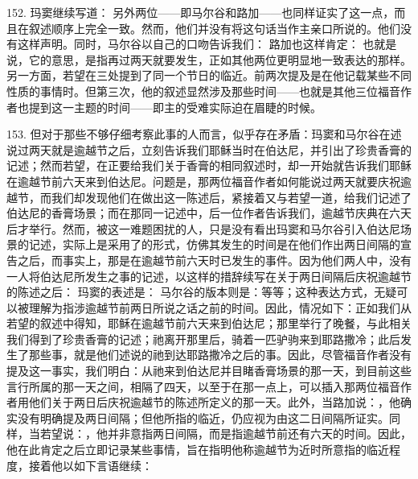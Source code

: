 152. 玛窦继续写道： 另外两位——即马尔谷和路加——也同样证实了这一点，而且在叙述顺序上完全一致。然而，他们并没有将这句话当作主亲口所说的。他们没有这样声明。同时，马尔谷以自己的口吻告诉我们： 路加也这样肯定： 也就是说，它的意思，是指再过两天就要发生，正如其他两位更明显地一致表达的那样。另一方面，若望在三处提到了同一个节日的临近。前两次提及是在他记载某些不同性质的事情时。但第三次，他的叙述显然涉及那些时间——也就是其他三位福音作者也提到这一主题的时间——即主的受难实际迫在眉睫的时候。\par

153. 但对于那些不够仔细考察此事的人而言，似乎存在矛盾：玛窦和马尔谷在述说过两天就是逾越节之后，立刻告诉我们耶稣当时在伯达尼，并引出了珍贵香膏的记述；然而若望，在正要给我们关于香膏的相同叙述时，却一开始就告诉我们耶稣在逾越节前六天来到伯达尼。问题是，那两位福音作者如何能说过两天就要庆祝逾越节，而我们却发现他们在做出这一陈述后，紧接着又与若望一道，给我们记述了伯达尼的香膏场景；而在那同一记述中，后一位作者告诉我们，逾越节庆典在六天后才举行。然而，被这一难题困扰的人，只是没有看出玛窦和马尔谷引入伯达尼场景的记述，实际上是采用了的形式，仿佛其发生的时间是在他们作出两日间隔的宣告之后，而事实上，那是在逾越节前六天时已发生的事件。因为他们两人中，没有一人将伯达尼所发生之事的记述，以这样的措辞续写在关于两日间隔后庆祝逾越节的陈述之后： 玛窦的表述是： 马尔谷的版本则是：等等；这种表达方式，无疑可以被理解为指涉逾越节前两日所说之话之前的时间。因此，情况如下：正如我们从若望的叙述中得知，耶稣在逾越节前六天来到伯达尼；那里举行了晚餐，与此相关我们得到了珍贵香膏的记述；祂离开那里后，骑着一匹驴驹来到耶路撒冷；此后发生了那些事，就是他们述说的祂到达耶路撒冷之后的事。因此，尽管福音作者没有提及这一事实，我们明白：从祂来到伯达尼并目睹香膏场景的那一天，到目前这些言行所属的那一天之间，相隔了四天，以至于在那一点上，可以插入那两位福音作者用他们关于两日后庆祝逾越节的陈述所定义的那一天。此外，当路加说：，他确实没有明确提及两日间隔；但他所指的临近，仍应视为由这二日间隔所证实。同样，当若望说：，他并非意指两日间隔，而是指逾越节前还有六天的时间。因此，他在此肯定之后立即记录某些事情，旨在指明他称逾越节为近时所意指的临近程度，接着他以如下言语继续： 
